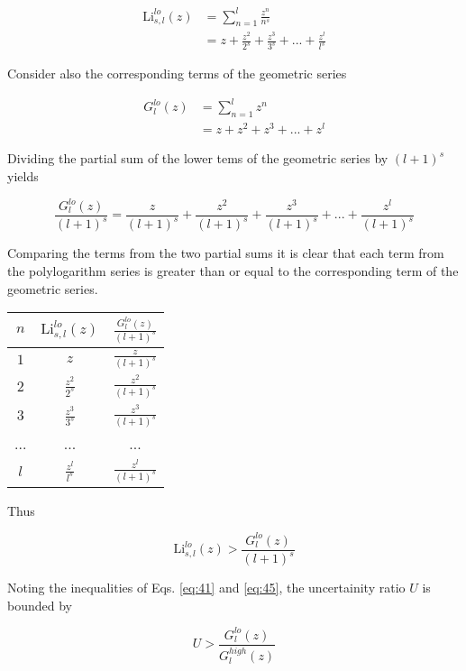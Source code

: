 \documentclass[letterpaper,12pt]{article}
\newcommand{\Li}{\textrm{Li}}
\begin{document}
\begin{align} \label{eq:42}
\Li_{s,l}^{lo}(z) &= \sum_{n = 1}^{l} \frac{z^{n}}{n^{s}} \\
 &= z + \frac{z^{2}}{2^{s}} + \frac{z^{3}}{3^{s}} + ... + \frac{z^{l}}{l^{s}}
\end{align}

\noindent Consider also the corresponding terms of the geometric series

\begin{align} \label{eq:43}
G_{l}^{lo}(z) &= \sum_{n = 1}^{l} z^{n} \\
 &= z + z^{2} + z^{3} + ... + z^{l}
\end{align}

\noindent Dividing the partial sum of the lower tems of the geometric series by $(l+1)^{s}$ yields

\begin{equation} \label{eq:44}
\frac{G_{l}^{lo}(z)}{(l+1)^{s}} = \frac{z}{(l+1)^{s}} + \frac{z^{2}}{(l+1)^{s}} + \frac{z^{3}}{(l+1)^{s}} + ... + \frac{z^{l}}{(l+1)^{s}}
\end{equation}

Comparing the terms from the two partial sums it is clear that each term from the polylogarithm series is greater than or equal to the corresponding term of the geometric series.

\begin{tabular}{ccc}
$n$ & $\Li_{s,l}^{lo}(z)$ & $\frac{G_{l}^{lo}(z)}{(l+1)^{s}}$ \\
\hline
$1$ & $z$ & $\frac{z}{(l+1)^{s}}$ \\
$2$ & $\frac{z^{2}}{2^{s}}$ & $\frac{z^{2}}{(l+1)^{s}}$ \\
$3$ & $\frac{z^{3}}{3^{s}}$ & $\frac{z^{3}}{(l+1)^{s}}$ \\
... & ... & ... \\
$l$ & $\frac{z^{l}}{l^{s}}$ & $\frac{z^{l}}{(l+1)^{s}}$ \\
\end{tabular}

\noindent Thus

\begin{equation} \label{eq:45}
\Li_{s,l}^{lo}(z) > \frac{G_{l}^{lo}(z)}{(l+1)^{s}}
\end{equation}

Noting the inequalities of Eqs. \ref{eq:41} and \ref{eq:45}, the uncertainity ratio $U$ is bounded by

\begin{equation} \label{eq:46}
U > \frac{G_{l}^{lo}(z)}{G_{l}^{high}(z)}
\end{equation}
\end{document}
